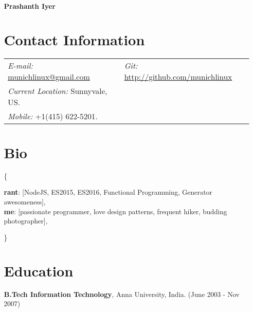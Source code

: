 \documentclass[margin, line, 10pt]{res}
\begin{document}
 \textbf{\LARGE Prashanth Iyer}
\vspace{.15cm} \\
\vspace{-.05cm}
\begin{resume}

\section{Contact Information}
\vspace{.05in}
\begin{tabular}{@{}p{3in}p{3in}}
{\it E-mail:} \href{mailto:munichlinux@gmail.com}{munichlinux@gmail.com} & {\it Git:} \href{http://github.com/munichlinux}{http://github.com/munichlinux} \\
{\it Current Location:} Sunnyvale, US. \\
{\it Mobile:}  +1(415) 622-5201.
\end{tabular}

\section{Bio}
\{
  \begin{addmargin}[1em]{0em}
  {\bf rant}: [NodeJS, ES2015, ES2016, Functional Programming, Generator awesomeness],\\
  {\bf me}: [passionate programmer, love design patterns, frequent hiker, budding photographer],
  \end{addmargin}
  \vspace{-.15in}
\}

\section{Education}
{\bf B.Tech Information Technology}, Anna University, India. \hfill (June 2003 - Nov 2007)


\end{resume}
\end{document}
